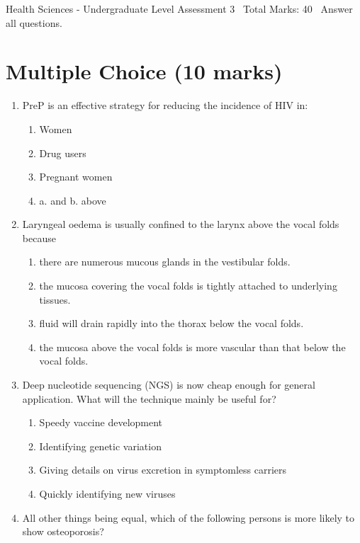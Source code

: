 \documentclass[12pt]{article}
\begin{document}
\begin{center}
Health Sciences - Undergraduate Level Assessment 3 \
Total Marks: 40 \
Answer all questions.
\end{center}

\section*{Multiple Choice (10 marks)}
\begin{enumerate}[label=\arabic*.]
\item PreP is an effective strategy for reducing the incidence of HIV in:
\begin{enumerate}[label=(\alph*)]
    \item Women
    \item Drug users
    \item Pregnant women
    \item a. and b. above
\end{enumerate}
\item Laryngeal oedema is usually confined to the larynx above the vocal folds because
\begin{enumerate}[label=(\alph*)]
    \item there are numerous mucous glands in the vestibular folds.
    \item the mucosa covering the vocal folds is tightly attached to underlying tissues.
    \item fluid will drain rapidly into the thorax below the vocal folds.
    \item the mucosa above the vocal folds is more vascular than that below the vocal folds.
\end{enumerate}
\item Deep nucleotide sequencing (NGS) is now cheap enough for general application. What will the technique mainly be useful for?
\begin{enumerate}[label=(\alph*)]
    \item Speedy vaccine development
    \item Identifying genetic variation
    \item Giving details on virus excretion in symptomless carriers
    \item Quickly identifying new viruses
\end{enumerate}
\item All other things being equal, which of the following persons is more likely to show osteoporosis?
\begin{enumerate}[label=(\alph*)]

\end{enumerate}
\end{enumerate}
\end{document}
